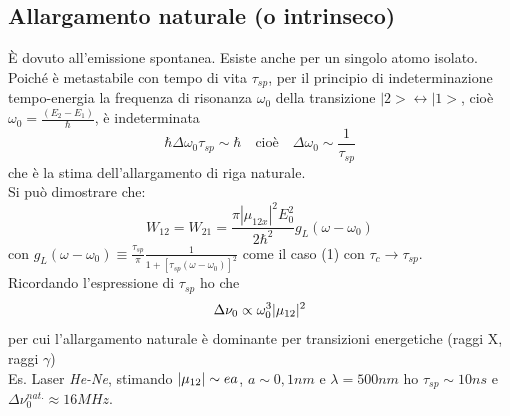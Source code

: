 \subsection{Allargamento naturale (o intrinseco)}
È dovuto all'emissione spontanea. Esiste anche per un singolo atomo isolato.
Poiché  è metastabile con tempo di vita $\tau_{sp}$, per il principio di indeterminazione tempo-energia la frequenza di risonanza $\omega_0$ della transizione $|2> \leftrightarrow |1>$, cioè $\omega_0 = \frac{(E_2 - E_1)}{\hbar}$, è indeterminata 
\begin{equation*}
\hbar \Delta\omega_0 \tau_{sp} \sim \hbar \quad \text{cioè} \quad \Delta \omega_0 \sim \frac{1}{\tau_{sp}}
\end{equation*}
che è la stima dell'allargamento di riga naturale.\\
Si può dimostrare che:
\begin{equation*}
W_{12} = W_{21} = \frac{\pi|\mu_{12x}|^2 E_0^2}{2\hbar^2} g_L(\omega - \omega_0)
\end{equation*}
con $g_L(\omega - \omega_0) \equiv \frac{\tau_{sp}}{\pi} \frac{1}{1 + [\tau_{sp}(\omega - \omega_0)]^2}$ come il caso (1) con $\tau_c \rightarrow \tau_{sp}$.\\
Ricordando l'espressione di $\tau_{sp}$ ho che
\begin{equation*}
\Delta \nu_0 \propto \omega_0^3 |\*\mu_{12}|^2
\end{equation*}
per cui l'allargamento naturale è dominante per transizioni energetiche (raggi X, raggi $\gamma$)\\
Es. Laser \textit{He-Ne}, stimando $|\*\mu_{12}| \sim ea$, $a \sim 0,1 nm$ e $\lambda = 500 nm$ ho $\tau_{sp} \sim 10 ns$ e $\Delta \nu_0^{nat.} \approx 16 MHz$.

